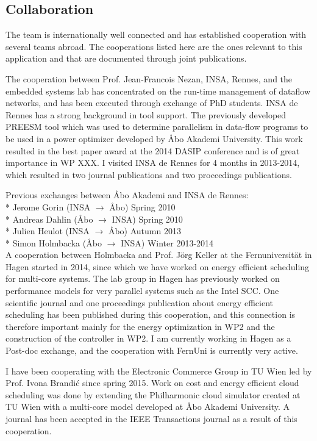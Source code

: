 \documentclass{article}
\begin{document}
\subsection{Collaboration}
The team is internationally well connected and has established cooperation with several teams abroad. 
The cooperations listed here are the ones relevant to this application and that are documented through joint publications.

The cooperation between Prof. Jean-Francois Nezan, INSA, Rennes, and the embedded systems lab has concentrated on the run-time management of dataflow networks, 
and has been executed through exchange of PhD students.
INSA de Rennes has a strong background in tool support. 
The previously developed PREESM tool which was used to determine parallelism in data-flow programs to be used in a power optimizer developed by \AA{}bo Akademi University.
This work resulted in the best paper award at the 2014 DASIP conference and is of great importance in WP XXX.
I visited INSA de Rennes for 4 months in 2013-2014, which resulted in two journal publications and two proceedings publications.

Previous exchanges between \AA{}bo Akademi and INSA de Rennes:\\
* Jerome Gorin (INSA $\longrightarrow$ \AA{}bo) Spring 2010\\
* Andreas Dahlin (\AA{}bo $\longrightarrow$ INSA) Spring 2010\\
* Julien Heulot (INSA $\longrightarrow$ \AA{}bo) Autumn 2013\\
* Simon Holmbacka (\AA{}bo $\longrightarrow$ INSA) Winter 2013-2014\\

A cooperation between Holmbacka and Prof. J\"{o}rg Keller at the Fernuniversit\"{a}t in Hagen started in 2014, since which we have worked on energy efficient scheduling for multi-core systems. 
The lab group in Hagen has previously worked on performance models for very parallel systems such as the Intel SCC.
One scientific journal and one proceedings publication about energy efficient scheduling has been published during this cooperation,
and this connection is therefore important mainly for the energy optimization in WP2 and the construction of the controller in WP2.
I am currently working in Hagen as a Post-doc exchange, and the cooperation with FernUni is currently very active.

I have been cooperating with the Electronic Commerce Group in TU Wien led by Prof. 
Ivona Brandi\'{c} since spring 2015. 
Work on cost and energy efficient cloud scheduling was done by extending the Philharmonic cloud simulator created at TU Wien with a multi-core model developed at \AA{}bo Akademi University. 
A journal has been accepted in the IEEE Transactions journal as a result of this cooperation.
\end{document}
